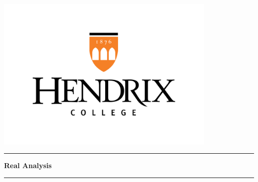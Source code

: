 \documentclass[12pt, oneside]{book}
\newcounter{BoxCounter}
\begin{document}



\newcommand{\titlestandin}[0]{Real Analysis}
\newcommand{\cussubtitle}[0]{MATH 350}
\newcommand{\startdate}[0]{August 26, 2024}
\newcommand{\customenddate}[0]{December 2, 2024}
\newcommand{\professor}[0]{Prof. Christopher Camfield, Ph.D.}




\begin{titlepage}
    \begin{center}

        \vspace*{-2cm}
        \includegraphics[width=0.8\textwidth]{images/Hendrix Logo.png}\\
        \vfill

        \textcolor{horange}{\rule{\textwidth}{1.0pt}}

        \vspace{2em}

        {\huge \textbf{\titlestandin}}

        \vspace{1em} %

        \textcolor{horange}{\rule{\textwidth}{1.0pt}}


\end{center}
\end{titlepage}
\end{document}
